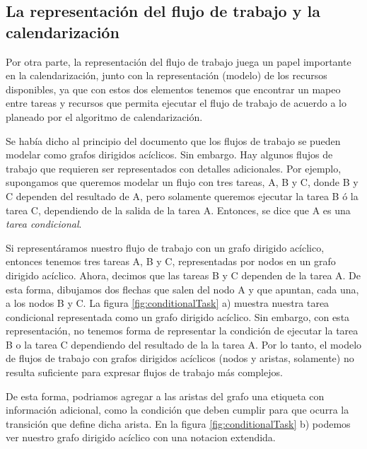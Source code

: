 \documentclass[letterpaper, 12pt]{report}
\begin{document}
\subsection*{La representación del flujo de trabajo y la calendarización}

Por otra parte, la representación del flujo de trabajo juega un papel importante en la calendarización, junto con la representación (modelo) de los recursos disponibles, ya que con estos dos elementos tenemos que encontrar un mapeo entre tareas y recursos que permita ejecutar el flujo de trabajo de acuerdo a lo planeado por el algoritmo de calendarización.


Se había dicho al principio del documento que los flujos de trabajo se pueden modelar como grafos dirigidos acíclicos. Sin embargo. Hay algunos flujos de trabajo que requieren ser representados con detalles adicionales. Por ejemplo, supongamos que queremos modelar un flujo con tres tareas, A, B y C, donde B y C dependen del resultado de A, pero solamente queremos ejecutar la tarea B ó la tarea C, dependiendo de la salida de la tarea A. Entonces, se dice que A es una \emph{tarea condicional}.

Si representáramos nuestro flujo de trabajo con un grafo dirigido acíclico, entonces tenemos tres tareas A, B y C, representadas por nodos en un grafo dirigido acíclico. Ahora, decimos que las tareas B y C dependen de la tarea A. De esta forma, dibujamos dos flechas que salen del nodo A y que apuntan, cada una, a los nodos B y C. La figura  \ref{fig:conditionalTask} a) muestra nuestra tarea condicional representada como un grafo dirigido acíclico. Sin embargo, con esta representación, no tenemos forma de representar la condición de ejecutar la tarea B o la tarea C dependiendo del resultado de la la tarea A. Por lo tanto, el modelo de flujos de trabajo con grafos dirigidos acíclicos (nodos y aristas, solamente) no resulta suficiente para expresar flujos de trabajo más complejos.

De esta forma, podriamos agregar a las aristas del grafo una etiqueta con información adicional, como la condición que deben cumplir para que ocurra la transición que define dicha arista. En la figura \ref{fig:conditionalTask} b) podemos ver nuestro grafo dirigido acíclico con una notacion extendida.
\end{document}

